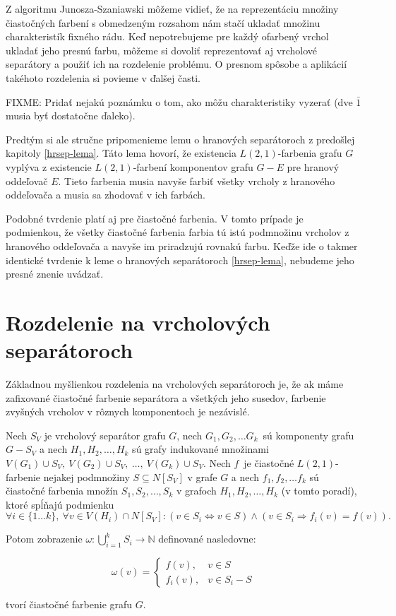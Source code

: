 Z algoritmu Junosza-Szaniawski môžeme vidieť, že na reprezentáciu množiny čiastočných farbení
s obmedzeným rozsahom nám stačí ukladať množinu charakteristík fixného rádu. Keď nepotrebujeme
pre každý ofarbený vrchol ukladať jeho presnú farbu, môžeme si dovoliť reprezentovať aj
vrcholové separátory a použiť ich na rozdelenie problému. O presnom spôsobe a aplikácií
takéhoto rozdelenia si povieme v ďalšej časti.

FIXME: Pridať nejakú poznámku o tom, ako môžu charakteristiky vyzerať (dve $\bar{1}$ musia byť
dostatočne ďaleko).

Predtým si ale stručne pripomenieme lemu o hranových separátoroch z predošlej kapitoly \ref{hrsep-lema}.
Táto lema hovorí, že existencia $L(2,1)$-farbenia grafu $G$ vyplýva z existencie $L(2,1)$-farbení
komponentov grafu $G-E$ pre hranový oddeľovač $E$. Tieto farbenia musia navyše farbiť všetky vrcholy
z hranového oddeľovača a musia sa zhodovať v ich farbách.

Podobné tvrdenie platí aj pre čiastočné farbenia. V tomto prípade je podmienkou, že všetky čiastočné
farbenia farbia tú istú podmnožinu vrcholov z hranového oddeľovača a navyše im priradzujú rovnakú farbu.
Keďže ide o takmer identické tvrdenie k leme o hranových separátoroch \ref{hrsep-lema}, nebudeme
jeho presné znenie uvádzať.

\section{Rozdelenie na vrcholových separátoroch}

Základnou myšlienkou rozdelenia na vrcholových separátoroch je, že ak máme zafixované čiastočné
farbenie separátora a všetkých jeho susedov, farbenie zvyšných vrcholov v rôznych komponentoch
je nezávislé.

\begin{lema}
    Nech $S_V$ je vrcholový separátor grafu $G$, nech $G_1, G_2, \ldots G_k$ sú komponenty
    grafu $G - S_V$ a nech $H_1, H_2, \ldots, H_k$ sú grafy indukované množinami $V(G_1) \cup S_V,\ V(G_2) \cup S_V,\ \ldots,\ V(G_k) \cup S_V$.
    Nech $f$ je čiastočné $L(2,1)$-farbenie nejakej podmnožiny $S \subseteq N[S_V]$ v grafe $G$ a nech $f_1, f_2, \ldots f_k$
    sú čiastočné farbenia množín $S_1, S_2, \ldots, S_k$ v grafoch $H_1, H_2, \ldots, H_k$ (v tomto poradí), ktoré spĺňajú podmienku
    $$ \forall i \in \{1 \ldots k\},\ \forall v \in V(H_i) \cap N[S_V]: (v \in S_i \Leftrightarrow v \in S) \wedge (v \in S_i \Rightarrow f_i(v) = f(v)).$$

    Potom zobrazenie $\omega: \bigcup \limits_{i=1}^k S_i \to \mathbb{N}$ definované nasledovne:

    \[ \omega(v) =
    \begin{cases}
        f(v), & v \in S \\
        f_i(v), & v \in S_i - S
    \end{cases}
    \]

    tvorí čiastočné farbenie grafu $G$.
\end{lema}

